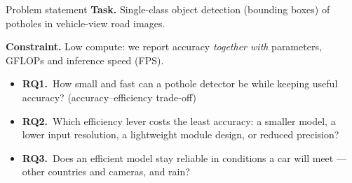 \documentclass[aspectratio=169,11pt]{beamer}
\newcommand{\researchq}[2]{\textbf{RQ#1.}~#2}
\begin{document}
\begin{frame}{Problem statement}
  \textbf{Task.} Single-class object detection (bounding boxes) of potholes in
  vehicle-view road images.

  \medskip
  \textbf{Constraint.} Low compute: we report accuracy \emph{together with}
  parameters, GFLOPs and inference speed (FPS).

  \bigskip
  \begin{itemize}
    \item[] \researchq{1}{How small and fast can a pothole detector be while keeping
      useful accuracy? (accuracy--efficiency trade-off)}
    \item[] \researchq{2}{Which efficiency lever costs the least accuracy: a smaller model,
      a lower input resolution, a lightweight module design, or reduced precision?}
    \item[] \researchq{3}{Does an efficient model stay reliable in conditions a car will meet
      --- other countries and cameras, and rain?}
  \end{itemize}
\end{frame}
\end{document}
